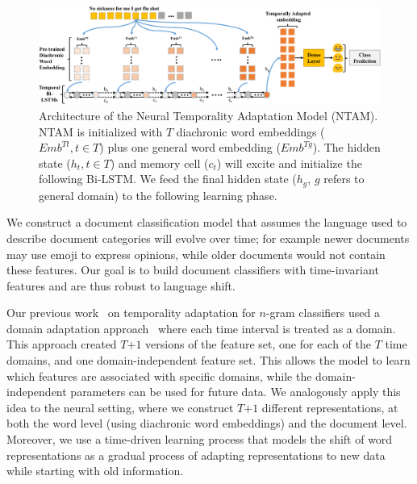 \begin{figure}[tb!]
\centering
\includegraphics[scale=0.47]{./images/chapter3/model.pdf}
\caption{Architecture of the Neural Temporality Adaptation Model (NTAM). 
NTAM is initialized with $T$ diachronic word embeddings ($Emb^{Tt}, t\in T$) plus one general word embedding ($Emb^{Tg}$). The hidden state ($h_t, t\in T$) and memory cell ($c_t$) will excite and initialize the following Bi-LSTM. We feed the final hidden state ($h_g$, $g$ refers to general domain) to the following learning phase.}
\label{chap3:fig:model}
\end{figure}

We construct a document classification model that assumes
the language used to describe document categories will evolve over time;
for example
newer documents may use emoji to express opinions,
while older documents would not contain these features.
Our goal is to build document classifiers with time-invariant features and are thus robust to language shift. 


Our previous work~\cite{huang2018examining} on temporality adaptation for $n$-gram classifiers used a domain adaptation approach~\cite{daume2007frustratingly} where 
each time interval is treated as a domain.
This approach created $T$$+1$ versions of the feature set, one for each of the $T$ time domains, and one domain-independent feature set.
This allows the model to learn which features are associated with specific domains, while the domain-independent parameters can be used for future data.
We analogously apply this idea to the neural setting, where we construct $T$$+1$ different representations, at both the word level (using diachronic word embeddings) and the document level.
Moreover, we use a time-driven learning process that models
the shift of word representations as a gradual process of adapting representations to new data while starting with old information.

